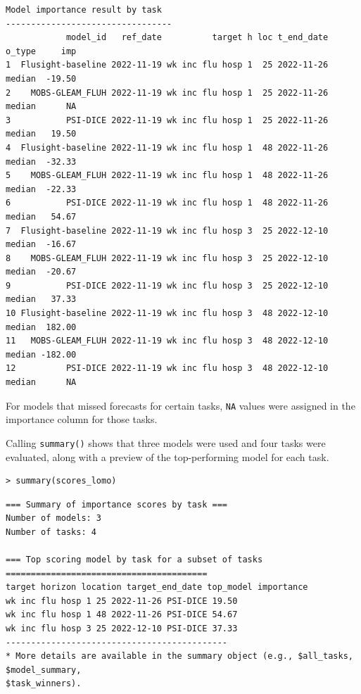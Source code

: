 \documentclass[
  article,
  shortnames,
  notitle]{jss}
\begin{document}
\small

\begin{verbatim}
Model importance result by task
---------------------------------
            model_id   ref_date          target h loc t_end_date o_type     imp
1  Flusight-baseline 2022-11-19 wk inc flu hosp 1  25 2022-11-26 median  -19.50
2    MOBS-GLEAM_FLUH 2022-11-19 wk inc flu hosp 1  25 2022-11-26 median      NA
3           PSI-DICE 2022-11-19 wk inc flu hosp 1  25 2022-11-26 median   19.50
4  Flusight-baseline 2022-11-19 wk inc flu hosp 1  48 2022-11-26 median  -32.33
5    MOBS-GLEAM_FLUH 2022-11-19 wk inc flu hosp 1  48 2022-11-26 median  -22.33
6           PSI-DICE 2022-11-19 wk inc flu hosp 1  48 2022-11-26 median   54.67
7  Flusight-baseline 2022-11-19 wk inc flu hosp 3  25 2022-12-10 median  -16.67
8    MOBS-GLEAM_FLUH 2022-11-19 wk inc flu hosp 3  25 2022-12-10 median  -20.67
9           PSI-DICE 2022-11-19 wk inc flu hosp 3  25 2022-12-10 median   37.33
10 Flusight-baseline 2022-11-19 wk inc flu hosp 3  48 2022-12-10 median  182.00
11   MOBS-GLEAM_FLUH 2022-11-19 wk inc flu hosp 3  48 2022-12-10 median -182.00
12          PSI-DICE 2022-11-19 wk inc flu hosp 3  48 2022-12-10 median      NA
\end{verbatim}

\normalsize

For models that missed forecasts for certain tasks, \texttt{NA} values
were assigned in the importance column for those tasks.

Calling \texttt{summary()} shows that three models were used and four
tasks were evaluated, along with a preview of the top-performing model
for each task.

\begin{verbatim}
> summary(scores_lomo)
\end{verbatim}

\small

\begin{verbatim}
=== Summary of importance scores by task ===
Number of models: 3
Number of tasks: 4

=== Top scoring model by task for a subset of tasks ========================================
target horizon location target_end_date top_model importance
wk inc flu hosp 1 25 2022-11-26 PSI-DICE 19.50
wk inc flu hosp 1 48 2022-11-26 PSI-DICE 54.67
wk inc flu hosp 3 25 2022-12-10 PSI-DICE 37.33
--------------------------------------------
* More details are available in the summary object (e.g., $all_tasks, $model_summary,
$task_winners).
\end{verbatim}
\end{document}
